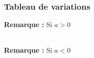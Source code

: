 \documentclass[a4paper,titlepage]{article}
\makeatletter
\def\tikzscale{1}\begin{lrbox}{\measure@tikzpicture}
\edef\tikzscale{\pgfmathresult}
\makeatother
\begin{document}
        \subsubsection{Tableau de variations}
            \textbf{Remarque :} Si $a>0$\\
            \begin{scaletikzpicturetowidth}{\textwidth}
            \end{scaletikzpicturetowidth}\\
            \textbf{Remarque :} Si $a<0$\\
            \begin{scaletikzpicturetowidth}{\textwidth}
            \end{scaletikzpicturetowidth}
\end{document}
